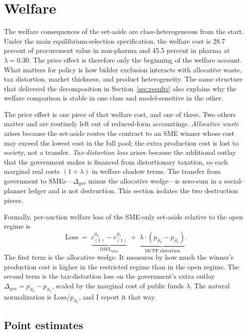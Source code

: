 \section{Welfare}\label{sec:welfare}

The welfare consequences of the set-aside are class-heterogeneous from the start. Under the main equilibrium-selection specification, the welfare cost is 28.7 percent of procurement value in non-pharma and 45.5 percent in pharma at $\lambda = 0.30$. The price effect is therefore only the beginning of the welfare account. What matters for policy is how bidder exclusion interacts with allocative waste, tax distortion, market thickness, and product heterogeneity. The same structure that delivered the decomposition in Section~\ref{sec:results} also explains why the welfare comparison is stable in one class and model-sensitive in the other.

The price effect is one piece of that welfare cost, and one of three. Two others matter and are routinely left out of reduced-form accountings. \emph{Allocative waste} arises because the set-aside routes the contract to an SME winner whose cost may exceed the lowest cost in the full pool; the extra production cost is lost to society, not a transfer. \emph{Tax-distortion loss} arises because the additional outlay that the government makes is financed from distortionary taxation, so each marginal real costs $(1+\lambda)$ in welfare shadow terms. The transfer from government to SMEs---$\Delta_{\text{gov}}$ minus the allocative wedge---is zero-sum in a social-planner ledger and is not destruction. This section isolates the two destruction pieces.

Formally, per-auction welfare loss of the SME-only set-aside relative to the open regime is
\begin{equation}\label{eq:welfare}
\mathrm{Loss} \;=\; \underbrace{c_{(1)}^{S_3} - c_{(1)}^{S_1}}_{\mathrm{DWL}_{\text{alloc}}}
\;+\; \underbrace{\lambda \cdot (p_{S_3} - p_{S_1})}_{\mathrm{MCPF\ distortion}}.
\end{equation}
The first term is the allocative wedge. It measures by how much the winner's production cost is higher in the restricted regime than in the open regime. The second term is the tax-distortion loss on the government's extra outlay $\Delta_{\text{gov}} = p_{S_3} - p_{S_1}$, scaled by the marginal cost of public funds $\lambda$. The natural normalization is $\mathrm{Loss} / p_{S_1}$, and I report it that way.

\subsection{Point estimates}

